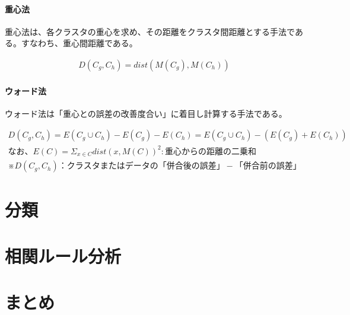 \documentclass[dvipdfmx]{jsarticle}
\begin{document}
\paragraph{重心法}
重心法は、各クラスタの重心を求め、その距離をクラスタ間距離とする手法である。すなわち、重心間距離である。
\begin{center}
  \begin{eqnarray*}
    D(C_{g}, C_{h}) = dist(M(C_{g}), M(C_{h}))
  \end{eqnarray*}
\end{center}
\paragraph{ウォード法}
ウォード法は「重心との誤差の改善度合い」に着目し計算する手法である。
\begin{center}
\begin{eqnarray*}
  D(C_{g}, C_{h}) = E(C_{g}\cup C_{h}) - E(C_{g}) - E(C_{h})
  = E(C_{g}\cup C_{h}) - (E(C_{g}) + E(C_{h})) \\
  なお、
  E(C) = \Sigma_{x\in C}dist(x, M(C))^{2} : 重心からの距離の二乗和\\
  ※D(C_{g}, C_{h})：クラスタまたはデータの「併合後の誤差」-「併合前の誤差」
\end{eqnarray*}
\end{center}


\section{分類}
\section{相関ルール分析}
\section{まとめ}
\end{document}
